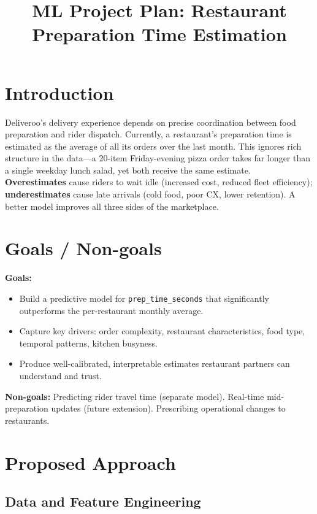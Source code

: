 \documentclass[11pt,a4paper]{article}
\title{\vspace{-2.5em}\textbf{ML Project Plan: Restaurant Preparation Time Estimation}\vspace{-1.5em}}
\author{}
\date{}
\begin{document}
\maketitle
\vspace{-1em}

\section{Introduction}

Deliveroo's delivery experience depends on precise coordination between food preparation and rider dispatch. Currently, a restaurant's preparation time is estimated as the average of all its orders over the last month. This ignores rich structure in the data---a 20-item Friday-evening pizza order takes far longer than a single weekday lunch salad, yet both receive the same estimate. \textbf{Overestimates} cause riders to wait idle (increased cost, reduced fleet efficiency); \textbf{underestimates} cause late arrivals (cold food, poor CX, lower retention). A better model improves all three sides of the marketplace.

\section{Goals / Non-goals}

\textbf{Goals:}
\begin{itemize}
\item Build a predictive model for \texttt{prep\_time\_seconds} that significantly outperforms the per-restaurant monthly average.
\item Capture key drivers: order complexity, restaurant characteristics, food type, temporal patterns, kitchen busyness.
\item Produce well-calibrated, interpretable estimates restaurant partners can understand and trust.
\end{itemize}

\textbf{Non-goals:} Predicting rider travel time (separate model). Real-time mid-preparation updates (future extension). Prescribing operational changes to restaurants.

\section{Proposed Approach}

\subsection{Data and Feature Engineering}
\end{document}

